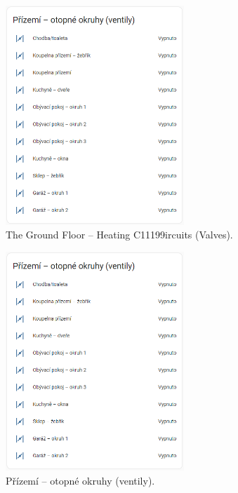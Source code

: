 \begin{English}
\begin{figure}[H]
    \centering
    \includegraphics[width=0.6\textwidth]{pictures/czech/software/heating-circuits-ground-floor.png}
    \caption{The Ground Floor – Heating C11199ircuits (Valves).}
    \label{fig:heating-circuits-ground-floor2}
\end{figure}
\end{English}

\begin{Czech}
\begin{figure}[H]
    \centering
    \includegraphics[width=0.6\textwidth]{pictures/czech/software/heating-circuits-ground-floor.png}
    \caption{Přízemí – otopné okruhy (ventily).}
    \label{fig:heating-circuits-ground-floor2}
\end{figure}
\end{Czech}

